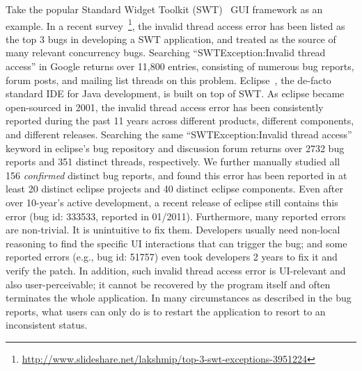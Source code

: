 Take the popular Standard Widget Toolkit (SWT)~\cite{swt} GUI framework as an example. 
In a recent survey~\footnote{\url{http://www.slideshare.net/lakshmip/top-3-swt-exceptions-3951224}}, the invalid thread access error
has been listed as the top 3 bugs in developing a SWT application, and treated
as the source of many relevant concurrency bugs. Searching
``SWTException:Invalid thread access'' in Google returns over 11,800 entries,
consisting of numerous bug reports, forum posts, and mailing list threads on
this problem. Eclipse~\cite{eclipse}, the de-facto standard IDE for Java development,
is built on top of SWT. As eclipse became open-sourced in 2001, the invalid thread access error has
been consistently reported during the past 11 years across different products, different components, and different releases.
Searching the same ``SWTException:Invalid thread access'' keyword in eclipse's bug repository
and discussion forum returns over 2732 bug reports and 351 distinct threads, respectively. 
We further manually studied all 156 \textit{confirmed} distinct bug reports, and 
found this error has been reported in at least 20 distinct eclipse projects
and 40 distinct eclipse components. Even after over 10-year's active development,
a recent release of eclipse still contains this error (bug id: 333533, reported in 01/2011).
 Furthermore, many reported  errors are non-trivial. It is unintuitive
to fix them. Developers usually
need non-local reasoning to find the specific UI interactions that can trigger the bug; and
some reported errors (e.g., bug id: 51757) even took developers 2 years to fix it and verify the
patch. In addition, such invalid thread access error is UI-relevant and also user-perceivable;
it cannot be recovered by the program itself and often terminates the whole application.
In many circumstances as described in the bug reports,
what users can only do is to restart the application to resort to an inconsistent status.




